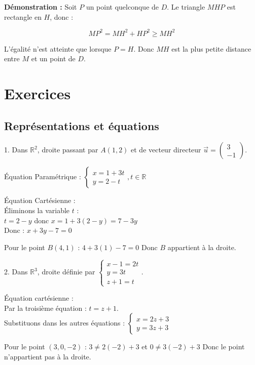 \documentclass[10pt,a4paper]{article}
\begin{document}
\textbf{Démonstration :}
Soit $P$ un point quelconque de $D$. Le triangle $MHP$ est rectangle en $H$, donc :

$$ MP^2 = MH^2 + HP^2 \geq MH^2 $$

L'égalité n'est atteinte que lorsque $P = H$. Donc $MH$ est la plus petite distance entre $M$ et un point de $D$.



\section*{Exercices}

\subsection*{Représentations et équations}

1. Dans $\mathbb{R}^2$, droite passant par $A(1, 2)$ et de vecteur directeur $\vec{u} = \begin{pmatrix} 3 \\ -1 \end{pmatrix}$.

  \ql Équation Paramétrique :
   $\begin{cases} x = 1 + 3t \\ y = 2 - t \end{cases}, t \in \mathbb{R}$

   Équation Cartésienne :\\
   Éliminons la variable $t$ :\\
   $t = 2 - y$ donc $x = 1 + 3(2 - y) = 7 - 3y$\\
   Donc : $x + 3y - 7 = 0$

  \ql Pour le point $B(4, 1)$ :
   $4 + 3(1) - 7 = 0$
   Donc $B$ appartient à la droite.

2. Dans $\mathbb{R}^3$, droite définie par $\begin{cases} x - 1 = 2t \\ y = 3t \\ z + 1 = t \end{cases}$.

  \ql Équation cartésienne :\\
   Par la troisième équation : $t = z + 1$.\\
   Substituons dans les autres équations :
   $\begin{cases} x = 2z + 3 \\ y = 3z + 3 \end{cases}$

  \ql Pour le point $(3, 0, -2)$ :
   $3 \neq 2(-2) + 3$ et $0 \neq 3(-2) + 3$
   Donc le point n'appartient pas à la droite.
\end{document}
